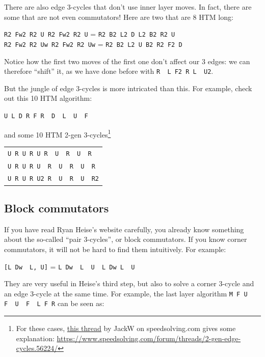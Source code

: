 \documentclass[11pt,a4paper]{book}
\newcommand{\p}{\textquotesingle}
\newcommand{\m}{\texttt}
\newcommand{\ps}{\p\,\,}
\begin{document}
There are also edge 3-cycles that don't use inner layer moves. In fact, there are some that are not even commutators! Here are two that are 8 HTM long:

\begin{center}
\m{R2 Fw2 R2 U R2 Fw2 R2 U} = \m{R2 B2 L2 D L2 B2 R2 U}\\
\m{R2 Fw2 R2 Uw R2 Fw2 R2 Uw} = \m{R2 B2 L2 U B2 R2 F2 D}
\end{center}

Notice how the first two moves of the first one don't affect our 3 edges: we can therefore ``shift'' it, as we have done before with \m{R\ps L F2 R L\ps U2}.

But the jungle of edge 3-cycles is more intricated than this. For example, check out this 10 HTM algorithm:

\begin{center}
\m{U L D R F R\ps D\ps L\ps U\ps F\p}
\end{center}

and some 10 HTM 2-gen 3-cycles\footnote{For these cases, \href{https://www.speedsolving.com/forum/threads/2-gen-edge-cycles.56224/}{this thread} by JackW on speedsolving.com gives some explanation: \url{https://www.speedsolving.com/forum/threads/2-gen-edge-cycles.56224/}}

\begin{center}
\begin{tabular}{l}
\m{U R U R U R\ps U\ps R\ps U\ps R\p}\\
\m{U R U R U\ps R\ps U\ps R\ps U\ps R}\\
\m{U R U R U2 R\ps U\ps R\ps U\ps R2}
\end{tabular}
\end{center}

\subsection{Block commutators}

If you have read Ryan Heise's website carefully, you already know something about the so-called ``pair 3-cycles'', or block commutators. If you know corner commutators, it will not be hard to find them intuitively. For example:

\begin{center}
\m{[L Dw\ps L\p, U\p]} = \m{L Dw\ps L\ps U\ps L Dw L\ps U}
\end{center}

They are very useful in Heise's third step, but also to solve a corner 3-cycle and an edge 3-cycle at the same time. For example, the last layer algorithm \m{M F U F\ps U\ps F\ps L F R\p} can be seen as:
\end{document}

